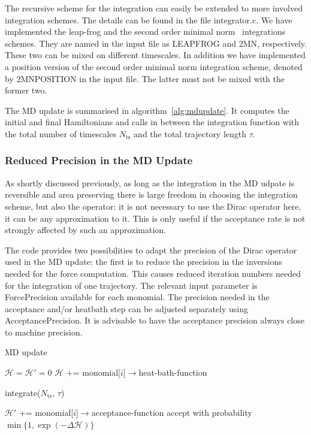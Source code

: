 The recursive scheme for the integration can easily be extended to
more involved integration schemes. The details can be found in the
file {\ttfamily integrator.c}. We have implemented the leap-frog and
the second order minimal norm~\cite{Takaishi:2005tz} integrations
schemes. They are named in the input file as {\ttfamily LEAPFROG} and
{\ttfamily 2MN}, respectively. These two can be mixed on
different timescales. In addition we have implemented a position
version of the second order minimal norm integration scheme, denoted by
{\ttfamily 2MNPOSITION} in the input file. The latter must not be mixed with
the former two.

The MD update is summarised in
algorithm~\ref{alg:mdupdate}. It computes the initial and final
Hamiltonians and calls in between the integration function with the
total number of timescales $N_\mathrm{ts}$ and the total trajectory
length $\tau$.

\subsubsection{Reduced Precision in the MD Update}

As shortly discussed previously, as long as the integration in the MD
udpate is reversible and area preserving there is large freedom in
choosing the integration scheme, but also the operator: it is not
necessary to use the Dirac operator here, it can be any approximation
to it. This is only useful if the acceptance rate is not strongly
affected by such an approximation.

The code provides two possibilities to adapt the precision of the
Dirac operator used in the MD update: the first is to reduce the
precision in the inversions needed for the force computation. This
causes reduced iteration numbers needed for the integration of one
trajectory. The relevant input parameter is {\ttfamily
  ForcePrecision} available for each monomial. The precision needed in
the acceptance and/or heatbath step can be adjusted separately using
{\ttfamily AcceptancePrecision}. It is advisable to have the
acceptance precision always close to machine precision.


\begin{algorithm}[t]
  \caption{MD update}
  \begin{algorithmic}[1]
    \STATE $\mathcal{H}=\mathcal{H}'=0$
    \STATE $\mathcal{H}$ += monomial[$i$]$\rightarrow$heat-bath-function
    \ENDFOR

    \STATE integrate($N_\mathrm{ts}$, $\tau$)

    \STATE $\mathcal{H}'$ += monomial[$i$]$\rightarrow$acceptance-function
    \ENDFOR
    \STATE accept with probability $\min\{1, \exp(-\Delta\mathcal{H})\}$
  \end{algorithmic}
  \label{alg:mdupdate}
\end{algorithm}


